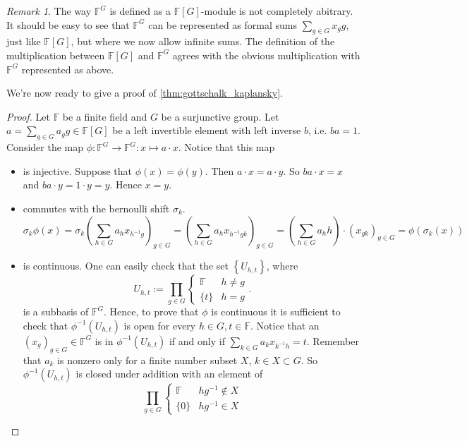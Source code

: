 \documentclass[titlepage, a4paper]{article}
\newcommand{\F}{\mathbb{F}}
\theoremstyle{remark}
\newtheorem{remark}{Remark}
\begin{document}
        \begin{remark}
        The way $\F^{G}$ is defined as a $\F[G]$-module is not completely abitrary. It should be easy to see that  $\F^{G}$ can be represented as formal sums $\sum_{g \in G} x_g g$, just like $\F[G]$, but where we now allow infinite sums. 
        The definition of the multiplication between  $\F[G]$ and  $\F^{G}$ agrees with the obvious multiplication with $\F^{G}$ represented as above. 
    \end{remark}
    
	We're now ready to give a proof of \cref{thm:gottschalk_kaplansky}.
	\begin{proof}
		Let $\F$ be a finite field and $G$ be a surjunctive group. 
		Let $a = \sum_{g \in G} a_g g \in \F[G]$ be a left invertible element with left inverse $b$, i.e.  $b a = 1$. 
		Consider the map $\phi: \F^{G} \to \F^{G}: x \mapsto a\cdot x$. Notice that this map 
		\begin{itemize}
			\item is injective. Suppose that $\phi(x) = \phi(y)$. Then $a\cdot x = a\cdot y$. So $ba\cdot x  = x$ and $ba \cdot y = 1\cdot y = y$. Hence $x = y$.
			\item commutes with the bernoulli shift  $\sigma_k$. 
				 \[
					 \sigma_k \phi(x) 
					 = \sigma_k\left( \sum_{h \in G} a_h x_{h^{-1}g} \right)_{g \in G} 
					 = \left( \sum_{h \in G} a_h x_{h^{-1}gk} \right)_{g \in G} 
					 = \left( \sum_{h \in G}a_h h \right) \cdot (x_{gk})_{g \in G} = \phi(\sigma_k(x)) 
				\]
			\item is continuous. 
			One can easily check that the set $\left\{ U_{h, t} \right\}$, where \[
			U_{h,t}:= \prod_{g \in G} \begin{cases}
				\F & h \ne g\\
				\{t\}& h = g
			\end{cases}
			.\] 
			is a subbasis of $\F^{G}$. 
			Hence, to prove that $\phi$ is continuous it is sufficient to check that $\phi^{-1}(U_{h, t})$ is open for every $h \in G, t\in \F$.
			Notice that an  $(x_g)_{g \in G} \in \F^{G}$ is in $\phi^{-1}(U_{h,t})$ if and only if $\sum_{k \in G} a_k x_{k^{-1}h} = t$. 
			Remember that $a_k$ is nonzero only for a finite number subset $X$,  $k\in X \subset G$. 	
			So $\phi^{-1}(U_{h, t})$ is closed under addition with an element of  \[
			\prod_{g \in G} \begin{cases}
				\F & hg^{-1}  \not\in X\\
				\{0\} & hg^{-1} \in X 
			\end{cases}
\]
\end{itemize}
\end{proof}
\end{document}
